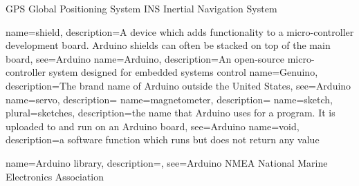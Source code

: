 %
%

{GPS}
{Global Positioning System}
{INS}
{Inertial Navigation System}

{name=shield,
description={A device which adds functionality to a micro-controller development board. Arduino shields can often be stacked on top of the main board},
see={Arduino}
}
{name=Arduino,
description={An open-source micro-controller system designed for embedded systems control}
}
{name=Genuino,
description={The brand name of Arduino outside the United States},
see={Arduino}
}
{name=servo,
description={}
}
{name=magnetometer,
description={}
}
{name=sketch,
plural={sketches},
description={the name that Arduino uses for a program. It is uploaded to and run on an Arduino board},
see={Arduino}
}
{name=void,
description={a software function which runs but does not return any value}
}

{name=Arduino library,
description={},
see={Arduino}
}
{NMEA}
{National Marine Electronics Association}
